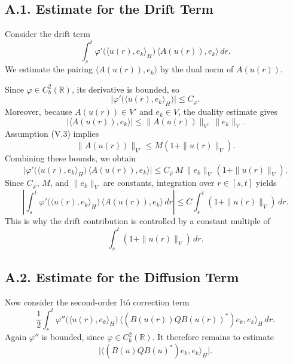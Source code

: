 \documentclass[11pt]{article}
\theoremstyle{definition}
\theoremstyle{remark}
\begin{document}
\subsection*{A.1. Estimate for the Drift Term}
Consider the drift term
\[
  \int_s^t \varphi'\bigl(\langle u(r),e_k\rangle_H\bigr)\,\langle A(u(r)),e_k\rangle\,dr.
\]
We estimate the pairing $\langle A(u(r)),e_k\rangle$ by the dual norm of $A(u(r))$.

Since $\varphi\in C_b^2(\mathbb R)$, its derivative is bounded, so
\[
  \bigl|\varphi'\bigl(\langle u(r),e_k\rangle_H\bigr)\bigr|\le C_\varphi.
\]
Moreover, because $A(u(r))\in V'$ and $e_k\in V$, the duality estimate gives
\[
  |\langle A(u(r)),e_k\rangle|
  \le \|A(u(r))\|_{V'}\,\|e_k\|_V.
\]
Assumption (V.3) implies
\[
  \|A(u(r))\|_{V'}\le M(1+\|u(r)\|_V).
\]
Combining these bounds, we obtain
\[
  \bigl|\varphi'\bigl(\langle u(r),e_k\rangle_H\bigr)\,\langle A(u(r)),e_k\rangle\bigr|
  \le C_\varphi\,M\,\|e_k\|_V\,(1+\|u(r)\|_V).
\]
Since $C_\varphi$, $M$, and $\|e_k\|_V$ are constants, integration over $r\in[s,t]$ yields
\[
  \left|
  \int_s^t \varphi'\bigl(\langle u(r),e_k\rangle_H\bigr)\,\langle A(u(r)),e_k\rangle\,dr
  \right|
  \le C\int_s^t (1+\|u(r)\|_V)\,dr.
\]
This is why the drift contribution is controlled by a constant multiple of
\[
  \int_s^t (1+\|u(r)\|_V)\,dr.
\]

\subsection*{A.2. Estimate for the Diffusion Term}
Now consider the second-order It\^o correction term
\[
  \frac12\int_s^t \varphi''\bigl(\langle u(r),e_k\rangle_H\bigr)\,
  \bigl\langle (B(u(r))Q B(u(r))^*)e_k,e_k\bigr\rangle_H\,dr.
\]
Again $\varphi''$ is bounded, since $\varphi\in C_b^2(\mathbb R)$. It therefore remains to estimate
\[
  \bigl|\bigl\langle (B(u)Q B(u)^*)e_k,e_k\bigr\rangle_H\bigr|.
\]
\end{document}
